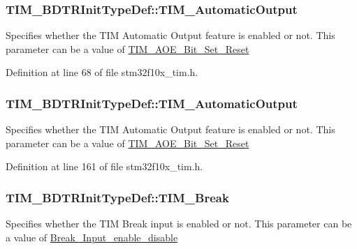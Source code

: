 \subsubsection[{\texorpdfstring{T\+I\+M\+\_\+\+Automatic\+Output}{TIM_AutomaticOutput}}]{ T\+I\+M\+\_\+\+B\+D\+T\+R\+Init\+Type\+Def\+::\+T\+I\+M\+\_\+\+Automatic\+Output}\hypertarget{struct_t_i_m___b_d_t_r_init_type_def_a5345b79c70196b6287e66e0c8ff516ba}{}\label{struct_t_i_m___b_d_t_r_init_type_def_a5345b79c70196b6287e66e0c8ff516ba}
Specifies whether the T\+IM Automatic Output feature is enabled or not. This parameter can be a value of \hyperlink{group___t_i_m___a_o_e___bit___set___reset}{T\+I\+M\+\_\+\+A\+O\+E\+\_\+\+Bit\+\_\+\+Set\+\_\+\+Reset} 

Definition at line 68 of file stm32f10x\+\_\+tim.\+h.

\subsubsection[{\texorpdfstring{T\+I\+M\+\_\+\+Automatic\+Output}{TIM_AutomaticOutput}}]{ T\+I\+M\+\_\+\+B\+D\+T\+R\+Init\+Type\+Def\+::\+T\+I\+M\+\_\+\+Automatic\+Output}\hypertarget{struct_t_i_m___b_d_t_r_init_type_def_a6c056e29af67fd8a32919104ea48eea2}{}\label{struct_t_i_m___b_d_t_r_init_type_def_a6c056e29af67fd8a32919104ea48eea2}
Specifies whether the T\+IM Automatic Output feature is enabled or not. This parameter can be a value of \hyperlink{group___t_i_m___a_o_e___bit___set___reset}{T\+I\+M\+\_\+\+A\+O\+E\+\_\+\+Bit\+\_\+\+Set\+\_\+\+Reset} 

Definition at line 161 of file stm32f10x\+\_\+tim.\+h.

\subsubsection[{\texorpdfstring{T\+I\+M\+\_\+\+Break}{TIM_Break}}]{ T\+I\+M\+\_\+\+B\+D\+T\+R\+Init\+Type\+Def\+::\+T\+I\+M\+\_\+\+Break}\hypertarget{struct_t_i_m___b_d_t_r_init_type_def_a91400514eba116626f8e8b4d0aee9044}{}\label{struct_t_i_m___b_d_t_r_init_type_def_a91400514eba116626f8e8b4d0aee9044}
Specifies whether the T\+IM Break input is enabled or not. This parameter can be a value of \hyperlink{group___break___input__enable__disable}{Break\+\_\+\+Input\+\_\+enable\+\_\+disable} 

